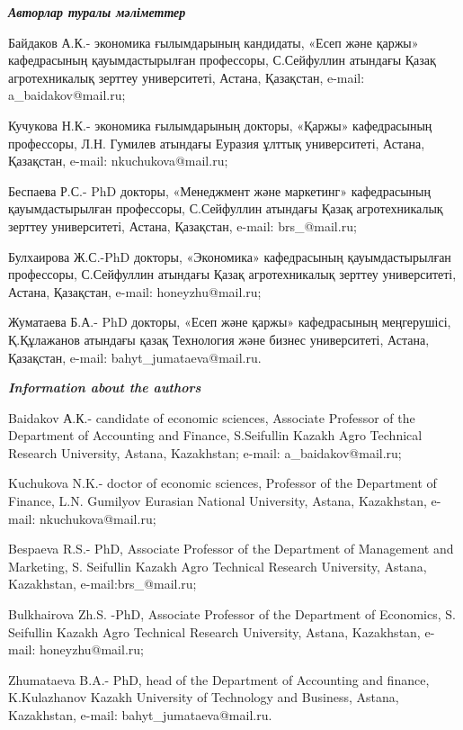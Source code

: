 \begin{authorinfo}
\emph{{\bfseries Авторлар туралы мәліметтер}}

Байдаков А.К.- экономика ғылымдарының кандидаты, «Есеп және қаржы»
кафедрасының қауымдастырылған профессоры, С.Сейфуллин атындағы Қазақ
агротехникалық зерттеу университеті, Астана, Қазақстан, e-mail:
a\_baidakov@mail.ru;

Кучукова Н.К.- экономика ғылымдарының докторы, «Қаржы» кафедрасының
профессоры, Л.Н. Гумилев атындағы Еуразия ұлттық университеті, Астана,
Қазақстан, e-mail: nkuchukova@mail.ru;

Беспаева Р.С.- PhD докторы, «Менеджмент және маркетинг» кафедрасының
қауымдастырылған профессоры, С.Сейфуллин атындағы Қазақ агротехникалық
зерттеу университеті, Астана, Қазақстан, e-mail: brs\_@mail.ru;

Булхаирова Ж.С.-PhD докторы, «Экономика» кафедрасының қауымдастырылған
профессоры, С.Сейфуллин атындағы Қазақ агротехникалық зерттеу
университеті, Астана, Қазақстан, e-mail: honeyzhu@mail.ru;

Жуматаева Б.А.- PhD докторы, «Есеп және қаржы» кафедрасының меңгерушісі,
Қ.Құлажанов атындағы қазақ Технология және бизнес университеті, Астана,
Қазақстан, e-mail: bahyt\_jumataeva@mail.ru.

\emph{{\bfseries Information about the authors}}

Baidakov А.К.- candidate of economic sciences, Associate Professor of
the Department of Accounting and Finance, S.Seifullin Kazakh Agro
Technical Research University, Astana, Kazakhstan; e-mail:
a\_baidakov@mail.ru;

Kuchukova N.K.- doctor of economic sciences, Professor of the Department
of Finance, L.N. Gumilyov Eurasian National University, Astana,
Kazakhstan, e-mail: nkuchukova@mail.ru;

Bespaeva R.S.- PhD, Associate Professor of the Department of Management
and Marketing, S. Seifullin Kazakh Agro Technical Research University,
Astana, Kazakhstan, e-mail:brs\_@mail.ru;

Bulkhairova Zh.S. -PhD, Associate Professor of the Department of
Economics, S. Seifullin Kazakh Agro Technical Research University,
Astana, Kazakhstan, e-mail: honeyzhu@mail.ru;

Zhumataeva B.A.- PhD, head of the Department of Accounting and finance,
K.Kulazhanov Kazakh University of Technology and Business, Astana,
Kazakhstan, e-mail: bahyt\_jumataeva@mail.ru.
\end{authorinfo}
